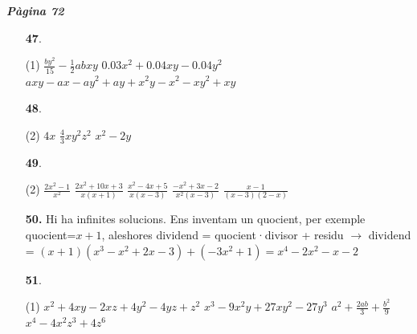 \documentclass[a4paper, pdf, twoside]{book}
\begin{document}
\begin{multicols}{2}

{\textbf{\em Pàgina 72}} \hrulefill
\begin{enumerate}
\vspace{0.25cm}



 \item[\fontfamily{phv}\selectfont\color{blue}\textbf{47}. ] 
 \begin{tasks}[column-sep=1em, item-indent=1.3333em](1)
	 \task $\frac {by^2}{15}-\frac {1}{2}abxy$
	 \task $0.03x^2 + 0.04 xy - 0.04 y^2$
	 \task $a x y - a x - a y^2 + a y + x^2 y - x^2 - x y^2 + x y$
\end{tasks}
 \end{enumerate}
\begin{enumerate}
\vspace{0.25cm}



 \item[\fontfamily{phv}\selectfont\color{blue}\textbf{48}. ] 
 \begin{tasks}[column-sep=1em, item-indent=1.3333em](2)
	 \task $4x$
	 \task $\frac {4}{3}xy^2 z^2$
	 \task $x^2-2y$
\end{tasks}
\vspace{0.25cm}



 \item[\fontfamily{phv}\selectfont\color{blue}\textbf{49}. ] 
 \begin{tasks}[column-sep=1em, item-indent=1.3333em](2)
	 \task $\frac {2x^2-1}{x^2}$
	 \task $\frac {2x^2+10x+3}{x(x+1)}$
	 \task $\frac {x^2-4x+5}{x(x-3)}$
	 \task $\frac {-x^2+3x-2}{x^2 (x-3)}$
	 \task $\frac {x-1}{(x-3)(2-x)}$
\end{tasks}
\vspace{0.25cm}
\item[\fontfamily{phv}\selectfont\color{blue}\textbf{50. }] 
Hi ha infinites solucions. Ens inventam un quocient, per exemple quocient=$x+1$, aleshores dividend = quocient·divisor + residu $\rightarrow $ dividend = $(x+1)(x^3-x^2+2x-3)+(-3x^2+1)=x^4-2x^2-x-2$
\vspace{0.25cm}



 \item[\fontfamily{phv}\selectfont\color{blue}\textbf{51}. ] 
 \begin{tasks}[column-sep=1em, item-indent=1.3333em](1)
	 \task $x^2+4xy-2xz+4y^2-4yz+z^2$
	 \task $x^3-9x^2y+27xy^2-27y^3$
	 \task* $a^2+\frac {2ab}{3}+\frac {b^2}{9}$
	 \task $x^4-4x^2 z^3 + 4z^6$
\end{tasks}
\vspace{0.25cm}



\end{enumerate}
\end{multicols}
\end{document}
